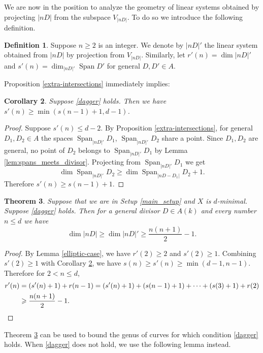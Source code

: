 \documentclass[11pt]{amsart}
\newcommand{\Span}{\operatorname{Span}}
\newtheorem{theorem}{Theorem}[section]
\newtheorem{corollary}[theorem]{Corollary}
\theoremstyle{definition}
\newtheorem{definition}[theorem]{Definition}
\theoremstyle{remark}
\begin{document}
We are now in the position to analyze the geometry of linear systems obtained by projecting \(|nD|\) from the subspace \(V_{|nD|}\).
To do so we introduce the following definition.

\begin{definition}
Suppose $n\geqslant 2$ is an integer. We denote by $|nD|'$ the linear system obtained from $|nD|$ by projection from $V_{|nD|}$. Similarly, let $r'(n)=\dim |nD|'$ and $s'(n)=\dim_{|nD|'}\Span D'$ for general $D, D' \in A$.
\end{definition}

\noindent Proposition \ref{extra-intersections} immediately implies:
\begin{corollary}\label{cor:s(n)-grows}
Suppose \eqref{dagger} holds. Then we have $s'(n) \geqslant \min(s(n-1)+1, d-1)$.
\end{corollary}
\begin{proof}
Suppose $s'(n) \leqslant d-2$. By Proposition \ref{extra-intersections}, for general $D_1, D_2 \in A$ the spaces \(\Span_{|nD|'} D_1\), \( \Span_{|nD|'} D_2\) share a point. Since \(D_1, D_2\) are general, no point of \(D_2\) belongs to \(\Span_{|nD|'} D_1\) by Lemma \ref{lem:spans_meets_divisor}.  Projecting from \(\Span_{|nD|'} D_1\) we get 
\[\dim \Span_{|nD|'} D_2 \geqslant \dim \Span_{|nD - D_1|} D_2+1.\]  Therefore  \(s'(n) \geqslant s(n-1)+1.\)
\end{proof}

\begin{theorem}\label{thm:nD_lower_bound}
Suppose that we are in Setup \ref{main_setup} and $X$ is $d$-minimal. Suppose \eqref{dagger} holds. Then for a general divisor $D \in A(k)$ and every number $n \leqslant d$ we have 
\[\dim |nD| \geqslant \dim |nD|' \geqslant \frac{n(n+1)}{2} - 1.\]
\end{theorem}
\begin{proof}
By Lemma \ref{elliptic-case}, we have $r'(2) \geqslant 2$ and $s'(2)\geqslant 1$. Combining \(s'(2) \geqslant 1\) with Corollary \ref{cor:s(n)-grows}, we have \(s(n) \geqslant s'(n) \geqslant \min(d-1, n-1)\). Therefore for $2<n\leqslant d$,  
\begin{align*}
r'(n) &= (s'(n) + 1) + r(n-1) = (s'(n)+1) + (s(n-1) + 1) + \cdots + (s(3) + 1) + r(2) \\
&\geqslant \frac{n(n+1)}{2} - 1.\qedhere
\end{align*}
\end{proof} 
Theorem \ref{thm:nD_lower_bound} can be used to bound the genus of curves for which  condition \eqref{dagger} holds. When \eqref{dagger} does not hold, we use the following lemma instead.
\end{document}
